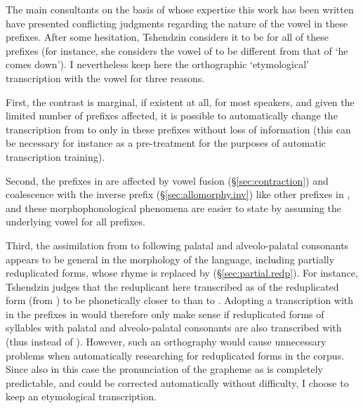 The main consultants on the basis of whose expertise this work has been written have presented conflicting judgments regarding the nature of the vowel in these prefixes. After some hesitation, Tshendzin considers it to be  for all of these prefixes (for instance, she considers the vowel of  to be different from that of  `he comes down'). I nevertheless keep here the orthographic `etymological' transcription with the vowel  for three reasons.

First, the contrast is marginal, if existent at all, for most speakers, and given the limited number of prefixes affected, it is possible to automatically change the transcription from  to  only in these prefixes without loss of information (this can be necessary for instance as a pre-treatment for the purposes of automatic transcription training). 

Second, the prefixes in  are affected by vowel fusion (§\ref{sec:contraction}) and coalescence with the inverse prefix  (§\ref{sec:allomorphy.inv}) like other prefixes in , and these morphophonological phenomena are easier to state by assuming the underlying vowel  for all prefixes. 

Third, the assimilation from  to  following palatal and alveolo-palatal consonants appears to be general in the morphology of the language, including partially reduplicated forms, whose rhyme is replaced by  (§\ref{sec:partial.redp}). For instance, Tshendzin judges that the reduplicant here transcribed as  of the reduplicated form  (from ) to be phonetically closer to  than to . Adopting a transcription with  in the prefixes in  would therefore only make sense if reduplicated forms of syllables with palatal and alveolo-palatal consonants are also transcribed with  (thus  instead of ). However, such an orthography would cause unnecessary problems when automatically researching for reduplicated forms in the corpus. Since also in this case the pronunciation of the grapheme  as  is completely predictable, and could be corrected automatically without difficulty, I choose to keep an etymological transcription. 

